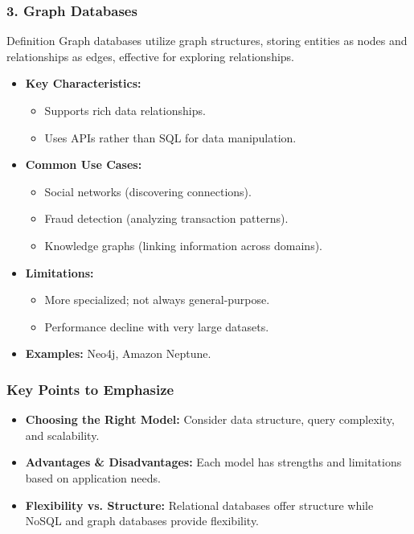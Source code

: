 \documentclass[aspectratio=169]{beamer}
\begin{document}
\begin{frame}[fragile]
    \frametitle{3. Graph Databases}
    \begin{block}{Definition}
        Graph databases utilize graph structures, storing entities as nodes and relationships as edges, effective for exploring relationships.
    \end{block}
    \begin{itemize}
        \item \textbf{Key Characteristics:}
        \begin{itemize}
            \item Supports rich data relationships.
            \item Uses APIs rather than SQL for data manipulation.
        \end{itemize}
        \item \textbf{Common Use Cases:}
        \begin{itemize}
            \item Social networks (discovering connections).
            \item Fraud detection (analyzing transaction patterns).
            \item Knowledge graphs (linking information across domains).
        \end{itemize}
        \item \textbf{Limitations:}
        \begin{itemize}
            \item More specialized; not always general-purpose.
            \item Performance decline with very large datasets.
        \end{itemize}
        \item \textbf{Examples:} Neo4j, Amazon Neptune.
    \end{itemize}
\end{frame}

\begin{frame}[fragile]
    \frametitle{Key Points to Emphasize}
    \begin{itemize}
        \item \textbf{Choosing the Right Model:} Consider data structure, query complexity, and scalability.
        \item \textbf{Advantages \& Disadvantages:} Each model has strengths and limitations based on application needs.
        \item \textbf{Flexibility vs. Structure:} Relational databases offer structure while NoSQL and graph databases provide flexibility.
    \end{itemize}
\end{frame}
\end{document}
